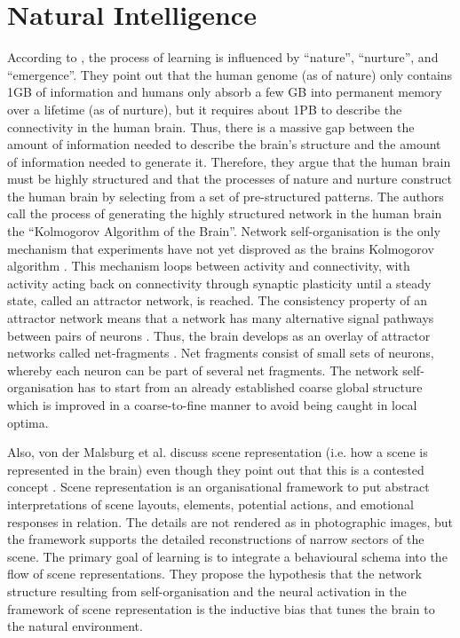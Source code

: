 \section{Natural Intelligence}
According to \cite{von_der_Malsburg_Stadelmann_Grewe_2022}, the process of learning is influenced by ``nature'', ``nurture'', and ``emergence''.
They point out that the human genome (as of nature) only contains 1GB of information  and humans only absorb a few GB into permanent memory over a lifetime (as of nurture), but it requires about 1PB to describe the connectivity in the human brain.
Thus, there is a massive gap between the amount of information needed to describe the brain's structure and the amount of information needed to generate it.
Therefore, they argue that the human brain must be highly structured and that the processes of nature and nurture construct the human brain by selecting from a set of pre-structured patterns.
The authors call the process of generating the highly structured network in the human brain the ``Kolmogorov  Algorithm of the Brain''.
Network self-organisation is the only mechanism that experiments have not yet disproved as the brains Kolmogorov algorithm .
This mechanism loops between activity and connectivity, with activity acting back on connectivity through synaptic plasticity until a steady state, called an attractor network, is reached.
The consistency property of an attractor network means that a network has many alternative signal pathways between pairs of neurons .
Thus, the brain develops as an overlay of attractor networks called net-fragments .
Net fragments consist of small sets of neurons, whereby each neuron can be part of several net fragments.
The network self-organisation has to start from an already established coarse global structure which is improved in a coarse-to-fine manner to avoid being caught in local optima.

Also, von der Malsburg et al. \cite{von_der_Malsburg_Stadelmann_Grewe_2022} discuss scene representation (i.e. how a scene is represented in the brain) even though they point out that this is a contested concept .
Scene representation is an organisational framework to put abstract interpretations of scene layouts, elements, potential actions, and emotional responses in relation.
The details are not rendered as in photographic images, but the framework supports the detailed reconstructions of narrow sectors of the scene.
The primary goal of learning is to integrate a behavioural schema into the flow of scene representations.
They propose the hypothesis that the network structure resulting from self-organisation and the neural activation in the framework of scene representation is the inductive bias that tunes the brain to the natural environment.

